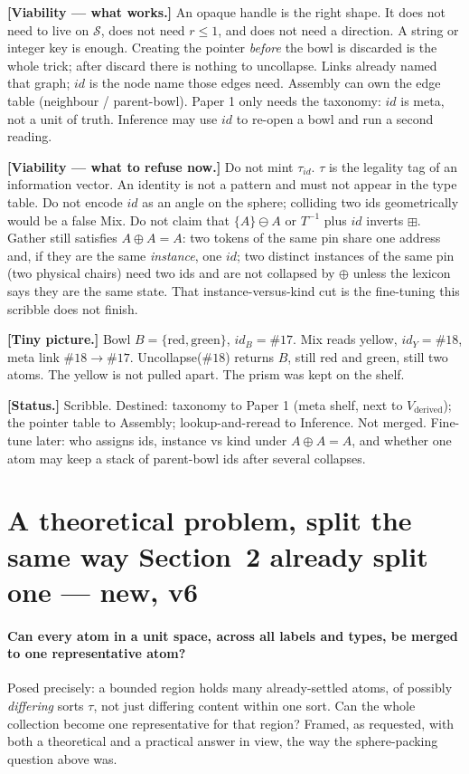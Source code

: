 \documentclass[11pt]{article}
\begin{document}
\textbf{[Viability --- what works.]}
An opaque handle is the right shape. It does not need to live on
$\mathcal{S}$, does not need $r\le 1$, and does not need a direction.
A string or integer key is enough. Creating the pointer \emph{before}
the bowl is discarded is the whole trick; after discard there is
nothing to uncollapse. Links already named that graph; $id$ is the
node name those edges need. Assembly can own the edge table
(neighbour / parent-bowl). Paper 1 only needs the taxonomy: $id$ is
meta, not a unit of truth. Inference may use $id$ to re-open a bowl
and run a second reading.

\textbf{[Viability --- what to refuse now.]}
Do not mint $\tau_{id}$. $\tau$ is the legality tag of an information
vector. An identity is not a pattern and must not appear in the type
table. Do not encode $id$ as an angle on the sphere; colliding two
ids geometrically would be a false Mix. Do not claim that
$\{A\}\ominus A$ or $T^{-1}$ plus $id$ inverts $\boxplus$. Gather
still satisfies $A\oplus A=A$: two tokens of the same pin share one
address and, if they are the same \emph{instance}, one $id$; two
distinct instances of the same pin (two physical chairs) need two
ids and are not collapsed by $\oplus$ unless the lexicon says they
are the same state. That instance-versus-kind cut is the fine-tuning
this scribble does not finish.

\textbf{[Tiny picture.]}
Bowl $B=\{\mathrm{red},\mathrm{green}\}$, $id_B=\#17$.
Mix reads yellow, $id_Y=\#18$, meta link $\#18\to\#17$.
Uncollapse($\#18$) returns $B$, still red and green, still two atoms.
The yellow is not pulled apart. The prism was kept on the shelf.

\textbf{[Status.]} Scribble. Destined: taxonomy to Paper 1 (meta
shelf, next to $V_{\mathrm{derived}}$); the pointer table to
Assembly; lookup-and-reread to Inference. Not merged. Fine-tune
later: who assigns ids, instance vs kind under $A\oplus A=A$, and
whether one atom may keep a stack of parent-bowl ids after several
collapses.

\section{A theoretical problem, split the same way Section~2 already
split one --- new, v6}

\paragraph{Can every atom in a unit space, across all labels and
types, be merged to one representative atom?} Posed precisely: a
bounded region holds many already-settled atoms, of possibly
\emph{differing} sorts $\tau$, not just differing content within one
sort. Can the whole collection become one representative for that
region? Framed, as requested, with both a theoretical and a practical
answer in view, the way the sphere-packing question above was.
\end{document}
